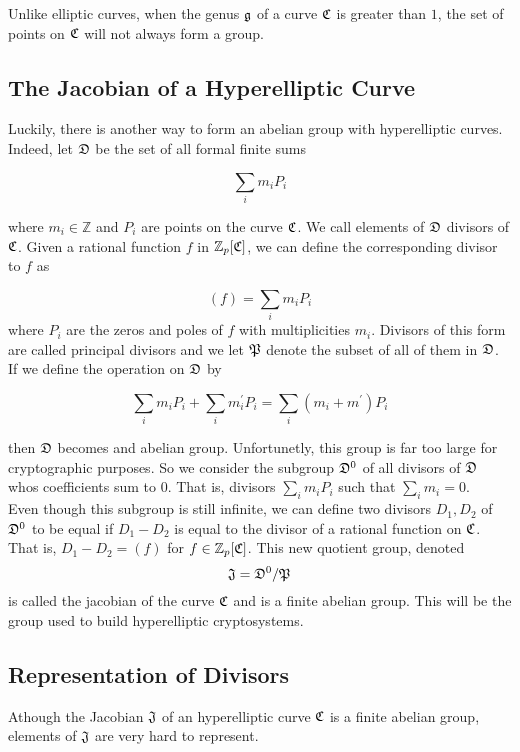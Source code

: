 Unlike elliptic curves, when the genus $\mathfrak{g}$ of a curve $\mathfrak{C} $ is greater than $1$, the set of points on $\mathfrak{C}$ will not always form a group. 

\begin{example}

\end{example}

\subsection{The Jacobian of a Hyperelliptic Curve}

Luckily, there is another way to form an abelian group with hyperelliptic curves. Indeed, let $\mathfrak{D}$ be the set of all formal finite sums 

$$ \sum_i m_i P_i $$ 

where $m_i \in \mathbb{Z}$ and $P_i$ are points on the curve $\mathfrak{C}$. We call elements of $\mathfrak{D}$ divisors of $\mathfrak{C}$. Given a rational function $f$ in $\mathbb{Z}_p[\mathfrak{C}]$, we can define the corresponding divisor to $f$ as

$$(f) = \sum_i m_i P_i $$ where $P_i$ are the zeros and poles of $f$ with multiplicities $m_i$. Divisors of this form are called principal divisors and we let $\mathfrak{P}$ denote the subset of all of them in $\mathfrak{D}$. If we define the operation on $\mathfrak{D}$ by 

$$ \sum_i m_i P_i  + \sum_i m^\prime_i P_i  = \sum_i (m_i+m^\prime) P_i $$ 

then $\mathfrak{D}$ becomes and abelian group. Unfortunetly, this group is far too large for cryptographic purposes. So we consider the subgroup $\mathfrak{D}^0$ of all divisors of $\mathfrak{D}$ whos coefficients sum to $0$. That is, divisors $ \sum_i m_i P_i $ such that $\sum_i m_i = 0$. \\ 

Even though this subgroup is still infinite, we can define two divisors $D_1, D_2$ of $\mathfrak{D}^0$ to be equal if $D_1 - D_2$ is equal to the divisor of a rational function on $\mathfrak{C}$. That is, $D_1 - D_2 = (f) $ for $f \in \mathbb{Z}_p[\mathfrak{C}]$. This new quotient group, denoted $$ \mathfrak{J} = \mathfrak{D}^0 / \mathfrak{P}$$ is called the jacobian of the curve $\mathfrak{C}$ and is a finite abelian group. This will be the group used to build hyperelliptic cryptosystems.

\subsection{Representation of Divisors}

Athough the Jacobian $\mathfrak{J}$ of an hyperelliptic curve $\mathfrak{C}$ is a finite abelian group, elements of $\mathfrak{J}$ are very hard to represent. 

\begin{example}
\end{example} 

